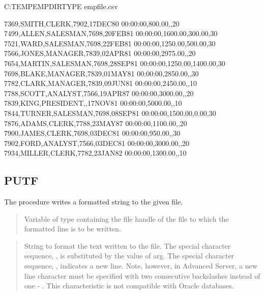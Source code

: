 \documentclass[letterpaper,10pt,english,openany,oneside]{sphinxmanual}
\begin{document}
%
\begin{sphinxVerbatim}[commandchars=\\\{\}]
C:\PYGZbs{}TEMP\PYGZbs{}EMPDIR\PYGZgt{}TYPE empfile.csv

7369,SMITH,CLERK,7902,17\PYGZhy{}DEC\PYGZhy{}80 00:00:00,800.00,,20
7499,ALLEN,SALESMAN,7698,20\PYGZhy{}FEB\PYGZhy{}81 00:00:00,1600.00,300.00,30
7521,WARD,SALESMAN,7698,22\PYGZhy{}FEB\PYGZhy{}81 00:00:00,1250.00,500.00,30
7566,JONES,MANAGER,7839,02\PYGZhy{}APR\PYGZhy{}81 00:00:00,2975.00,,20
7654,MARTIN,SALESMAN,7698,28\PYGZhy{}SEP\PYGZhy{}81 00:00:00,1250.00,1400.00,30
7698,BLAKE,MANAGER,7839,01\PYGZhy{}MAY\PYGZhy{}81 00:00:00,2850.00,,30
7782,CLARK,MANAGER,7839,09\PYGZhy{}JUN\PYGZhy{}81 00:00:00,2450.00,,10
7788,SCOTT,ANALYST,7566,19\PYGZhy{}APR\PYGZhy{}87 00:00:00,3000.00,,20
7839,KING,PRESIDENT,,17\PYGZhy{}NOV\PYGZhy{}81 00:00:00,5000.00,,10
7844,TURNER,SALESMAN,7698,08\PYGZhy{}SEP\PYGZhy{}81 00:00:00,1500.00,0.00,30
7876,ADAMS,CLERK,7788,23\PYGZhy{}MAY\PYGZhy{}87 00:00:00,1100.00,,20
7900,JAMES,CLERK,7698,03\PYGZhy{}DEC\PYGZhy{}81 00:00:00,950.00,,30
7902,FORD,ANALYST,7566,03\PYGZhy{}DEC\PYGZhy{}81 00:00:00,3000.00,,20
7934,MILLER,CLERK,7782,23\PYGZhy{}JAN\PYGZhy{}82 00:00:00,1300.00,,10
\end{sphinxVerbatim}


\subsection{PUTF}
\label{\detokenize{utl_file:putf}}
The  procedure writes a formatted string to the given file.
\begin{quote}


\sphinxcode{{[}, ...{]})}
\end{quote}


\begin{quote}

Variable of type  containing the file handle of the file to
which the formatted line is to be written.
\end{quote}

\begin{quote}

String to format the text written to the file. The special character
sequence, , is substituted by the value of arg. The special character
sequence, , indicates a new line. Note, however, in Advanced Server,
a new line character must be specified with two consecutive backslashes
instead of one - . This characteristic is not compatible with
Oracle databases.
\end{quote}
\end{document}
